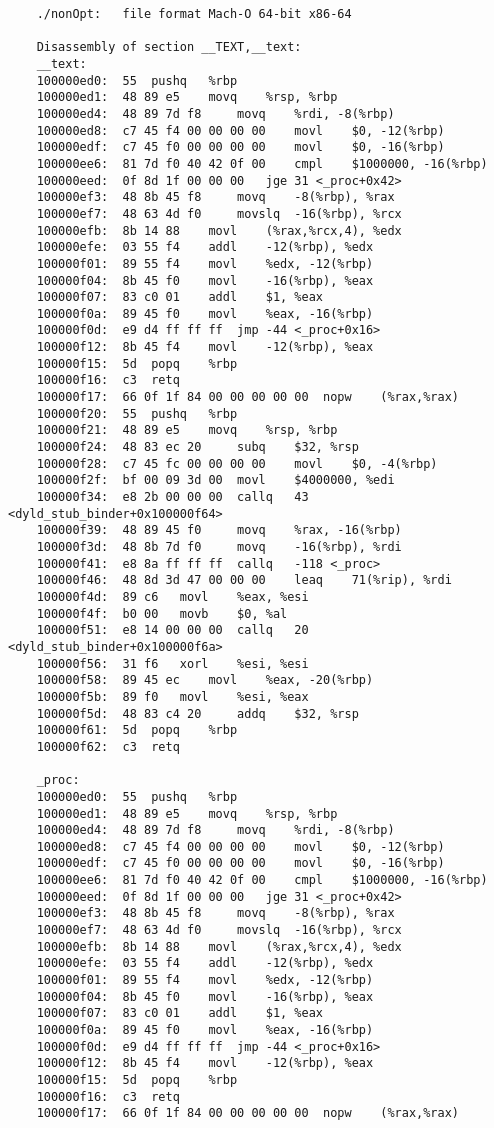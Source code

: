 \documentclass[a4paper]{article}
\begin{document}
\begin{lstlisting}
    ./nonOpt:	file format Mach-O 64-bit x86-64

    Disassembly of section __TEXT,__text:
    __text:
    100000ed0:	55 	pushq	%rbp
    100000ed1:	48 89 e5 	movq	%rsp, %rbp
    100000ed4:	48 89 7d f8 	movq	%rdi, -8(%rbp)
    100000ed8:	c7 45 f4 00 00 00 00 	movl	$0, -12(%rbp)
    100000edf:	c7 45 f0 00 00 00 00 	movl	$0, -16(%rbp)
    100000ee6:	81 7d f0 40 42 0f 00 	cmpl	$1000000, -16(%rbp)
    100000eed:	0f 8d 1f 00 00 00 	jge	31 <_proc+0x42>
    100000ef3:	48 8b 45 f8 	movq	-8(%rbp), %rax
    100000ef7:	48 63 4d f0 	movslq	-16(%rbp), %rcx
    100000efb:	8b 14 88 	movl	(%rax,%rcx,4), %edx
    100000efe:	03 55 f4 	addl	-12(%rbp), %edx
    100000f01:	89 55 f4 	movl	%edx, -12(%rbp)
    100000f04:	8b 45 f0 	movl	-16(%rbp), %eax
    100000f07:	83 c0 01 	addl	$1, %eax
    100000f0a:	89 45 f0 	movl	%eax, -16(%rbp)
    100000f0d:	e9 d4 ff ff ff 	jmp	-44 <_proc+0x16>
    100000f12:	8b 45 f4 	movl	-12(%rbp), %eax
    100000f15:	5d 	popq	%rbp
    100000f16:	c3 	retq
    100000f17:	66 0f 1f 84 00 00 00 00 00 	nopw	(%rax,%rax)
    100000f20:	55 	pushq	%rbp
    100000f21:	48 89 e5 	movq	%rsp, %rbp
    100000f24:	48 83 ec 20 	subq	$32, %rsp
    100000f28:	c7 45 fc 00 00 00 00 	movl	$0, -4(%rbp)
    100000f2f:	bf 00 09 3d 00 	movl	$4000000, %edi
    100000f34:	e8 2b 00 00 00 	callq	43 <dyld_stub_binder+0x100000f64>
    100000f39:	48 89 45 f0 	movq	%rax, -16(%rbp)
    100000f3d:	48 8b 7d f0 	movq	-16(%rbp), %rdi
    100000f41:	e8 8a ff ff ff 	callq	-118 <_proc>
    100000f46:	48 8d 3d 47 00 00 00 	leaq	71(%rip), %rdi
    100000f4d:	89 c6 	movl	%eax, %esi
    100000f4f:	b0 00 	movb	$0, %al
    100000f51:	e8 14 00 00 00 	callq	20 <dyld_stub_binder+0x100000f6a>
    100000f56:	31 f6 	xorl	%esi, %esi
    100000f58:	89 45 ec 	movl	%eax, -20(%rbp)
    100000f5b:	89 f0 	movl	%esi, %eax
    100000f5d:	48 83 c4 20 	addq	$32, %rsp
    100000f61:	5d 	popq	%rbp
    100000f62:	c3 	retq
    
    _proc:
    100000ed0:	55 	pushq	%rbp
    100000ed1:	48 89 e5 	movq	%rsp, %rbp
    100000ed4:	48 89 7d f8 	movq	%rdi, -8(%rbp)
    100000ed8:	c7 45 f4 00 00 00 00 	movl	$0, -12(%rbp)
    100000edf:	c7 45 f0 00 00 00 00 	movl	$0, -16(%rbp)
    100000ee6:	81 7d f0 40 42 0f 00 	cmpl	$1000000, -16(%rbp)
    100000eed:	0f 8d 1f 00 00 00 	jge	31 <_proc+0x42>
    100000ef3:	48 8b 45 f8 	movq	-8(%rbp), %rax
    100000ef7:	48 63 4d f0 	movslq	-16(%rbp), %rcx
    100000efb:	8b 14 88 	movl	(%rax,%rcx,4), %edx
    100000efe:	03 55 f4 	addl	-12(%rbp), %edx
    100000f01:	89 55 f4 	movl	%edx, -12(%rbp)
    100000f04:	8b 45 f0 	movl	-16(%rbp), %eax
    100000f07:	83 c0 01 	addl	$1, %eax
    100000f0a:	89 45 f0 	movl	%eax, -16(%rbp)
    100000f0d:	e9 d4 ff ff ff 	jmp	-44 <_proc+0x16>
    100000f12:	8b 45 f4 	movl	-12(%rbp), %eax
    100000f15:	5d 	popq	%rbp
    100000f16:	c3 	retq
    100000f17:	66 0f 1f 84 00 00 00 00 00 	nopw	(%rax,%rax)
    

\end{lstlisting}
\end{document}
